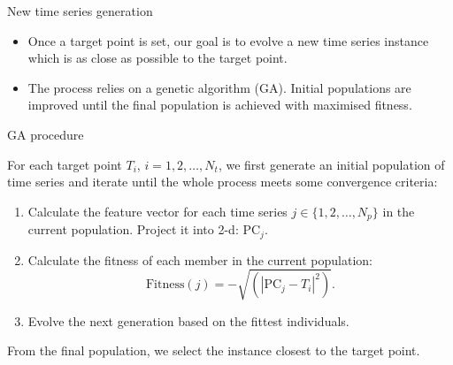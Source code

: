 \documentclass[12pt,ignorenonframetext,compress]{beamer}
\providecommand{\tightlist}{%
\setlength{\itemsep}{0pt}\setlength{\parskip}{0pt}}
\begin{document}
\begin{frame}{New time series generation}

\begin{itemize}
\item
  Once a target point is set, our goal is to evolve a new time series
  instance which is as close as possible to the target point.
\item
  The process relies on a genetic algorithm (GA). Initial populations
  are improved until the final population is achieved with maximised
  fitness.
\end{itemize}

\end{frame}

\begin{frame}{GA procedure}

For each target point \(T_i\), \(i = 1, 2, \dots, N_t\), we first
generate an initial population of time series and iterate until the
whole process meets some convergence criteria:

\begin{enumerate}
\def\labelenumi{\arabic{enumi}.}
\tightlist
\item
  Calculate the feature vector for each time series
  \(j \in \{1, 2, \dots, N_p\}\) in the current population. Project it
  into 2-d: \(\text{PC}_j\).
\item
  Calculate the fitness of each member in the current population: \[
        \text{Fitness}(j) = - \sqrt{(|\text{PC}_j-T_i|^2)}.
      \]
\item
  Evolve the next generation based on the fittest individuals.
\end{enumerate}

From the final population, we select the instance closest to the target
point.

\end{frame}
\end{document}
